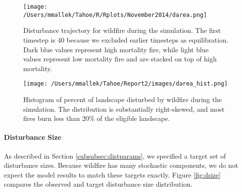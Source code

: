 
\begin{figure}[!htbp]
\centering
\texttt{[image: /Users/mmallek/Tahoe/R/Rplots/November2014/darea.png]}
\caption{Disturbance trajectory for wildfire during the simulation. The first timestep is 40 because we excluded earlier timesteps as equilibration. Dark blue values represent high mortality fire, while light blue values represent low mortality fire and are stacked on top of high mortality.}
\label{fig:darea}
\end{figure}

\begin{figure}[!htbp]
\centering
\texttt{[image: /Users/mmallek/Tahoe/Report2/images/darea\_hist.png]}
\caption{Histogram of percent of landscape disturbed by wildfire during the simulation. The distribution is substantially right-skewed, and most fires burn less than 20\% of the eligible landscape.}
\label{fig:darea_hist}
\end{figure}



\paragraph{Disturbance Size}
As described in Section \ref{subsubsec:distparams}, we specified a target set of disturbance sizes. Because wildfire has many stochastic components, we do not expect the model results to match these targets exactly. Figure \ref{fig:dsize} compares the observed and target disturbance size distribution.


